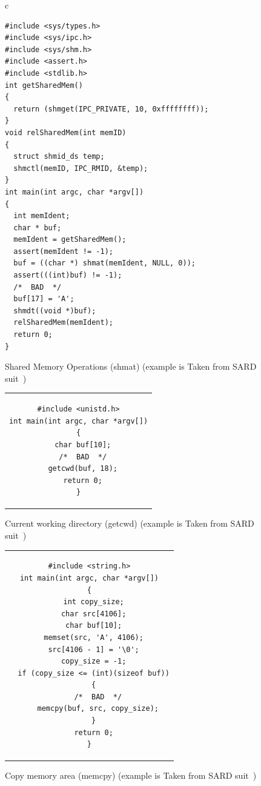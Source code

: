\begin{figure}
\begin{centering}
\begin{tabular}{ c }
\begin{lstlisting}
#include <sys/types.h>
#include <sys/ipc.h>
#include <sys/shm.h>
#include <assert.h>
#include <stdlib.h>
int getSharedMem()
{
  return (shmget(IPC_PRIVATE, 10, 0xffffffff));
}
void relSharedMem(int memID)
{
  struct shmid_ds temp;
  shmctl(memID, IPC_RMID, &temp);
}
int main(int argc, char *argv[])
{
  int memIdent;
  char * buf;
  memIdent = getSharedMem();
  assert(memIdent != -1);
  buf = ((char *) shmat(memIdent, NULL, 0));
  assert(((int)buf) != -1);
  /*  BAD  */
  buf[17] = 'A';
  shmdt((void *)buf);
  relSharedMem(memIdent);
  return 0;
}
\end{lstlisting}
\end{tabular}
\caption{Shared Memory Operations (shmat) (example is Taken from SARD suit~\protect\citep{sardcite})\label{fig:fig47}}
\par\end{centering}
\end{figure}

\begin{figure}
\begin{centering}
\begin{tabular}{ c }
\begin{lstlisting}
#include <unistd.h>
int main(int argc, char *argv[])
{
  char buf[10];
  /*  BAD  */
  getcwd(buf, 18);
  return 0;
}
\end{lstlisting}
\end{tabular}
\caption{Current working directory (getcwd) (example is Taken from SARD suit~\protect\citep{sardcite})\label{fig:fig48}}
\par\end{centering}
\end{figure}

\begin{figure}
\begin{centering}
\begin{tabular}{ c }
\begin{lstlisting}
#include <string.h>
int main(int argc, char *argv[])
{
  int copy_size;
  char src[4106];
  char buf[10];
  memset(src, 'A', 4106);
  src[4106 - 1] = '\0';
  copy_size = -1;
  if (copy_size <= (int)(sizeof buf))
  {
    /*  BAD  */
    memcpy(buf, src, copy_size);
  }
  return 0;
}
\end{lstlisting}
\end{tabular}
\caption{Copy memory area (memcpy) (example is Taken from SARD suit~\protect\citep{sardcite})\label{fig:fig49}}
\par\end{centering}
\end{figure}

